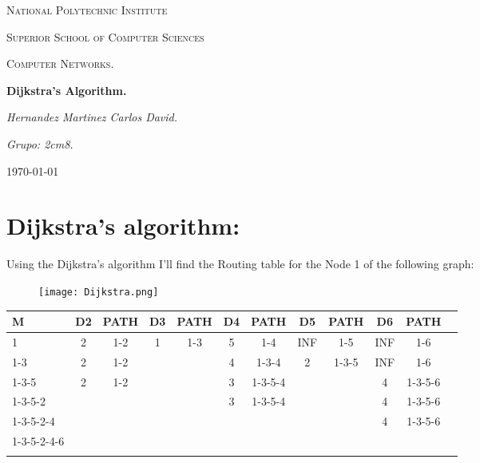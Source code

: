 \documentclass[10pt,a4paper]{article}
\begin{document}
\begin{titlepage}
	\centering
	{ \huge \scshape National Polytechnic Institute\par}
	{ \Large \scshape  Superior School of Computer Sciences\par }
	\vspace{1cm}
	{\scshape\Large Computer Networks.\par}
	\vspace{1.5cm}
	{\Huge\bfseries Dijkstra's Algorithm.\par}
	\vspace{2cm}
	{\Large\itshape Hernandez Martinez Carlos David.\par}
	{\Large\itshape Grupo: 2cm8. \par}
	\vfill
	{\large \today\par} 
	\vfill
\end{titlepage}


\tableofcontents 
{}
\pagebreak

\section{Dijkstra's algorithm:}

Using the Dijkstra's algorithm I'll find the Routing table for the Node 1 of the following graph:

\begin{figure}[H]
\texttt{[image: Dijkstra.png]} 
\centering
\end{figure}

\begin{center}
\begin{tabular}[.5cm]{l c c c c c c c c c c c}
\toprule
M & D2 & PATH & D3 & PATH & D4 & PATH & D5 & PATH & D6 & PATH \\
\midrule
1 & 2 & 1-2 & 1 & 1-3 & 5 & 1-4 & INF & 1-5 & INF & 1-6 \\
\cmidrule{2-11}
1-3 & 2 & 1-2 &  &  & 4 & 1-3-4 & 2 & 1-3-5 & INF & 1-6 \\
\cmidrule{2-11}
1-3-5 & 2 & 1-2 &  &  & 3 & 1-3-5-4 &  &  & 4 & 1-3-5-6 \\
\cmidrule{2-11}
1-3-5-2 &  &  &  &  & 3 & 1-3-5-4 &  &  & 4 & 1-3-5-6 \\
\cmidrule{2-11}
1-3-5-2-4 &  &  &  &  &  &  &  &  & 4 & 1-3-5-6 \\
\cmidrule{2-11}
1-3-5-2-4-6 &  &  &  &  &  &  &  &  &  &  \\
\bottomrule
\linebreak
\end{tabular}
\end{center} 
\end{document}
